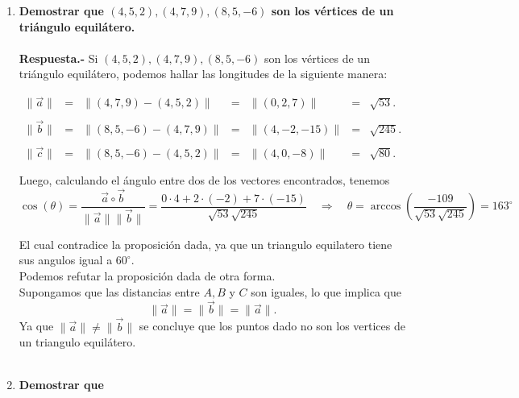 \begin{enumerate}
\item \textbf{\boldmath Demostrar que $(4,5,2),(4,7,9),(8,5,-6)$ son los vértices de un triángulo equilátero.\\\\
    Respuesta.-}\; Si $(4,5,2),(4,7,9),(8,5,-6)$ son los vértices de un triángulo equilátero, podemos hallar las longitudes de la siguiente manera: 

    $$\begin{array}{rcccccl}
	\|\vec{a}\| &=& \|(4,7,9)-(4,5,2)\|&=&\|(0,2,7)\| &=& \sqrt{53}.\\\\
	\|\vec{b}\| &=& \|(8,5,-6)-(4,7,9)\| &=& \|(4,-2,-15)\| &=& \sqrt{245}.\\\\
	\|\vec{c}\| &=& \|(8,5,-6)-(4,5,2)\| &=& \|(4,0,-8)\| &=& \sqrt{80}.\\\\
    \end{array}$$
    Luego, calculando el ángulo entre dos de los vectores encontrados, tenemos
    $$\cos(\theta)=\dfrac{\vec{a}\circ \vec{b}}{\|\vec{a}\|\|\vec{b}\|}=\dfrac{0\cdot 4 + 2\cdot(-2)+7\cdot(-15)}{\sqrt{53}\sqrt{245}}\quad \Rightarrow \quad \theta=\arccos\left(\dfrac{-109}{\sqrt{53}\sqrt{245}}\right)=163^\circ$$

    El cual contradice la proposición dada, ya que un triangulo equilatero tiene sus angulos igual a $60^\circ$.\\

    Podemos refutar la proposición dada de otra forma.\\
    Supongamos que las distancias entre $A,B$ y $C$ son iguales, lo que implica que 
    $$\|\vec{a}\|=\|\vec{b}\|=\|\vec{a}\|.$$ 
    Ya que $\|\vec{a}\|\neq \|\vec{b}\|$ se concluye que los puntos dado no son los vertices de un triangulo equilátero.\\\\


\item \textbf{\boldmath Demostrar que}
    \begin{enumerate}[a)]


\end{enumerate}
\end{enumerate}

